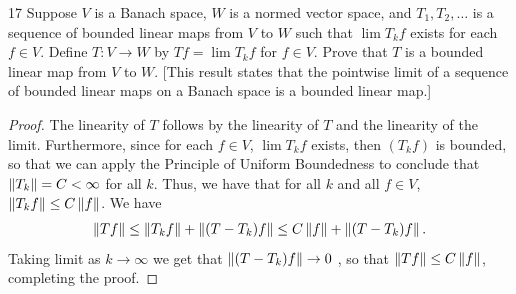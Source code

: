 \begin{exercise}{17}
Suppose $V$ is a Banach space, $W$ is a normed vector space, and $T_1, T_2, \dots$ is a sequence of bounded linear maps from $V$ to $W$ such that $\lim T_k f$ exists for each $f \in V$.
Define $T: V \to W$ by $Tf = \lim T_k f$ for $f \in V$.
Prove that $T$ is a bounded linear map from $V$ to $W$.
[This result states that the pointwise limit of a sequence of bounded linear maps on a Banach space is a bounded linear map.]
\end{exercise}
\begin{proof}
The linearity of $T$ follows by the linearity of $T$ and the linearity of the limit.
Furthermore, since for each $f \in V$, $\lim T_k f$ exists, then $(T_k f)$ is bounded, so that we can apply the Principle of Uniform Boundedness to conclude that $\left\lVert T_k\right\rVert = C < \infty$ for all $k$.
Thus, we have that for all $k$ and all $f \in V$, $\left\lVert T_k f\right\rVert \leq C \left\lVert f\right\rVert$.
We have
\begin{align*}
    \left\lVert Tf\right\rVert
    \leq \left\lVert T_k f\right\rVert + \left\lVert (T - T_k)f\right\rVert
    \leq C\left\lVert f\right\rVert + \left\lVert (T - T_k)f\right\rVert.
\end{align*}
Taking limit as $k \to \infty$ we get that $\left\lVert (T - T_k)f\right\rVert \to 0$ , so that $\left\lVert Tf\right\rVert \leq C \left\lVert f\right\rVert$, completing the proof.
\end{proof} 
